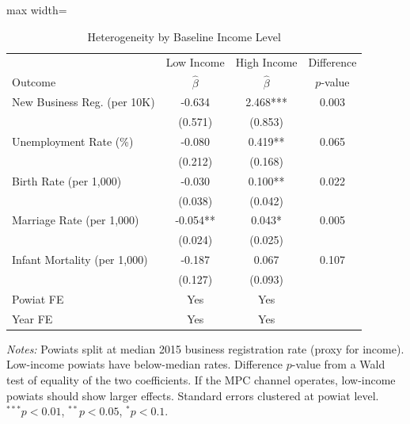 \begin{table}[htbp]
\centering
\caption{Heterogeneity by Baseline Income Level}
\label{tab:heterogeneity}
\begin{threeparttable}
\begin{adjustbox}{max width=\textwidth}
\begin{tabular}{lccc}
\toprule
 & Low Income & High Income & Difference \\
Outcome & $\hat{\beta}$ & $\hat{\beta}$ & $p$-value \\
\midrule
New Business Reg. (per 10K) & -0.634 & 2.468*** & 0.003 \\
 & (0.571) & (0.853) & \\
Unemployment Rate (\%) & -0.080 & 0.419** & 0.065 \\
 & (0.212) & (0.168) & \\
Birth Rate (per 1,000) & -0.030 & 0.100** & 0.022 \\
 & (0.038) & (0.042) & \\
Marriage Rate (per 1,000) & -0.054** & 0.043* & 0.005 \\
 & (0.024) & (0.025) & \\
Infant Mortality (per 1,000) & -0.187 & 0.067 & 0.107 \\
 & (0.127) & (0.093) & \\
\midrule
Powiat FE & Yes & Yes & \\
Year FE & Yes & Yes & \\
\bottomrule
\end{tabular}
\end{adjustbox}
\begin{tablenotes}[flushleft]\small
\item \textit{Notes:} Powiats split at median 2015 business registration rate (proxy for income). Low-income powiats have below-median rates. Difference $p$-value from a Wald test of equality of the two coefficients. If the MPC channel operates, low-income powiats should show larger effects. Standard errors clustered at powiat level. $^{***}p<0.01$, $^{**}p<0.05$, $^{*}p<0.1$.
\end{tablenotes}
\end{threeparttable}
\end{table}
